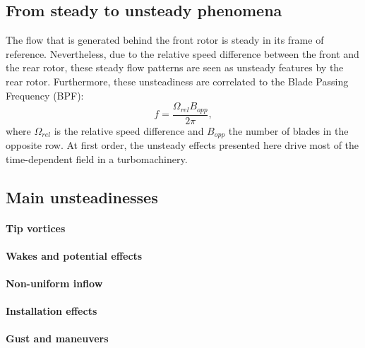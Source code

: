 
\subsection{From steady to unsteady phenomena}
\label{sub:cror_from_steady_to_unsteady_phenomena}

The flow that is generated behind the front rotor
is steady in its frame of reference. Nevertheless,
due to the relative speed difference between the
front and the rear rotor, these steady flow patterns are
seen as unsteady features by the rear rotor. Furthermore,
these unsteadiness are correlated to the Blade Passing Frequency (BPF):
\begin{equation}
	f = \frac{\Omega_{rel} B_{opp}}{2 \pi},
\end{equation}
where $\Omega_{rel}$ is the relative speed difference 
and $B_{opp}$ the number of blades in the opposite row.
At first order, the unsteady effects presented here drive
most of the time-dependent field in a turbomachinery.

\subsection{Main unsteadinesses}
\label{sub:cror_main_unsteadinesses}

\paragraph{Tip vortices}

\paragraph{Wakes and potential effects}

\paragraph{Non-uniform inflow}

\paragraph{Installation effects}

\paragraph{Gust and maneuvers}
